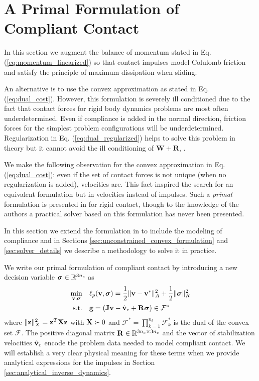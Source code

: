 
\section{A Primal Formulation of Compliant Contact}

In this section we augment the balance of momentum stated in Eq.
(\ref{eq:momentum_linearized}) so that contact impulses model Colulomb friction
and satisfy the principle of maximum dissipation when sliding. 

An alternative is to use the convex approximation as stated in Eq.
(\ref{eq:dual_cost}). However, this formulation is severely ill conditioned due
to the fact that contact forces for rigid body dynamics problems are most often
underdetermined. Even if compliance is added in the normal direction, friction
forces for the simplest problem configurations will be underdetermined.
Regularization in Eq. (\ref{eq:dual_regularized}) helps to solve this problem in
theory but it cannot avoid the ill conditioning of $\mathbf{W}+\mathbf{R}$,
\cite{bib:enzenhofer2019efficient}.

We make the following observation for the convex approximation in Eq.
(\ref{eq:dual_cost}): even if the set of contact forces is not unique (when no
regularization is added), velocities are. This fact inspired the search
for an equivalent formulation but in velocities instead of impulses. Such a
\textit{primal} formulation is presented in \cite{bib:mazhar2014} for rigid
contact, though to the knowledge of the authors a practical solver based on this
formulation has never been presented.

In this section we extend the formulation in \cite{bib:mazhar2014} to include
the modeling of compliance and in Sections
\ref{sec:unconstrained_convex_formulation} and \ref{sec:solver_details} we
describe a methodology to solve it in practice.

We write our primal formulation of compliant contact by introducing a new
decision variable ${\bm{\sigma}}\in\mathbb{R}^{3n_c}$ as
\begin{equation}
	\begin{aligned}
	\min_{\mf{v},\bsigma} \quad & \ell_p(\mf{v},\bsigma) =
	\frac{1}{2}\Vert\mf{v}-\mf{v}^*\Vert_{A}^2 +
	\frac{1}{2} \Vert\bsigma\Vert_{R}^2\\
	\textrm{s.t.} \quad & \mf{g} = (\mf{J}\mf{v}-\hat{\mf{v}}_c + \mf{R}\bsigma) \in \mathcal{F}^*\\
	\end{aligned}
	\label{eq:primal_regularized}
\end{equation}
where $\Vert{\mathbf{z}}\Vert_X^2={\mathbf{z}}^T{\mathbf{X}}{\mathbf{z}}$ with ${\mathbf{X}}\succ 0$
and $\mathcal{F^*}=\prod_{k=1}^{n_k}\mathcal{F}^*_k$ is the dual of the convex
set $\mathcal{F}$. The positive diagonal matrix ${\mathbf{R}}\in\mathbb{R}^{3n_c\times
3n_c}$ and the vector of stabilization velocities $\hat{{\mathbf{v}}}_c$ encode the
problem data needed to model compliant contact. We will establish a very clear
physical meaning for these terms when we provide analytical expressions for the
impulses in Section \ref{sec:analytical_inverse_dynamics}.

